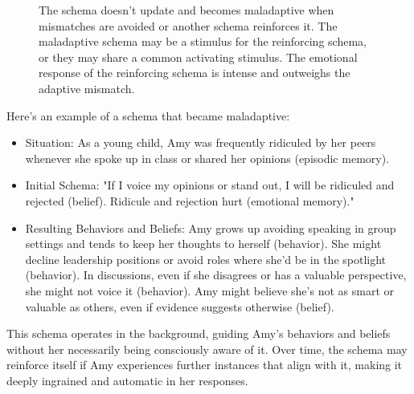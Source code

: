 \documentclass[12pt,letterpaper]{book}
\begin{document}
\begin{figure}[h!]
\begin{framed}
\begin{tikzpicture}[on grid, node distance=1.5cm]
\end{tikzpicture}
\end{framed}
\caption{The schema doesn't update and becomes maladaptive when mismatches are avoided or another schema reinforces it. The maladaptive schema may be a stimulus for the reinforcing schema, or they may share a common activating stimulus. The emotional response of the reinforcing schema is intense and outweighs the adaptive mismatch.}
\label{fig:maladaptiveSchema1}
\end{figure}
\FloatBarrier
Here's an example of a schema that became maladaptive:
\begin{itemize}
    \item Situation: As a young child, Amy was frequently ridiculed by her peers whenever she spoke up in class or shared her opinions (episodic memory).
    \item Initial Schema: "If I voice my opinions or stand out, I will be ridiculed and rejected (belief). Ridicule and rejection hurt (emotional memory)."
    \item Resulting Behaviors and Beliefs: Amy grows up avoiding speaking in group settings and tends to keep her thoughts to herself (behavior). She might decline leadership positions or avoid roles where she'd be in the spotlight (behavior). In discussions, even if she disagrees or has a valuable perspective, she might not voice it (behavior). Amy might believe she's not as smart or valuable as others, even if evidence suggests otherwise (belief).
\end{itemize}
This schema operates in the background, guiding Amy's behaviors and beliefs without her necessarily being consciously aware of it. Over time, the schema may reinforce itself if Amy experiences further instances that align with it, making it deeply ingrained and automatic in her responses.
\end{document}

